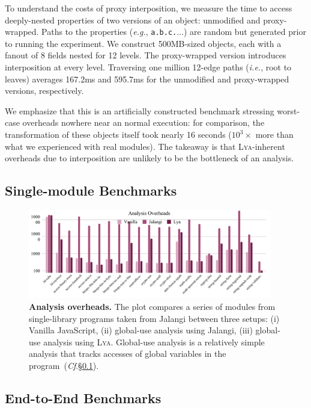 \documentclass[letterpaper,twocolumn,10pt]{article}
\def\eg{{\em e.g.}, }
\def\ie{{\em i.e.}, }
\newcommand{\ttt}[1]{\texttt{#1}}
\newcommand{\cf}[1]{(\emph{Cf}.\S\ref{#1})}
\newcommand{\sys}{{\scshape Lya}\xspace}
\begin{document}
To understand the costs of proxy interposition, we measure the time to access deeply-nested properties of two versions of an object:
  unmodified and proxy-wrapped.
Paths to the properties (\eg \ttt{a.b.c.$\ldots$}) are random but generated prior to running the experiment.
We construct 500MB-sized objects, each with a fanout of 8 fields nested for 12 levels.
The proxy-wrapped version introduces interposition at every level.
Traversing one million 12-edge paths (\ie root to leaves) averages 167.2ms and 595.7ms for the unmodified and proxy-wrapped versions, respectively.

We emphasize that this is an artificially constructed benchmark stressing worst-case overheads nowhere near an normal execution:
  for comparison, the transformation of these objects itself took nearly 16 seconds ($10^3\times$ more than what we experienced with real modules).
The takeaway is that \sys-inherent overheads due to interposition are unlikely to be the bottleneck of an analysis.

\subsection{Single-module Benchmarks}
\label{meso}

\begin{figure}[t]
  \centering
   \includegraphics[width=0.95\textwidth]{./figs/meso2.pdf}
  \caption{
    \textbf{Analysis overheads.}
    The plot compares a series of modules from single-library programs taken from Jalangi between three setups:
		(i) Vanilla JavaScript, (ii) global-use analysis using Jalangi, (iii) global-use analysis using \sys.
    Global-use analysis is a relatively simple analysis that tracks accesses of global variables in the program~\cf{meso}.
  }
  \label{fig:meso}
  \vspace{-3mm}
\end{figure}


\subsection{End-to-End Benchmarks}
\label{macro}
\end{document}
